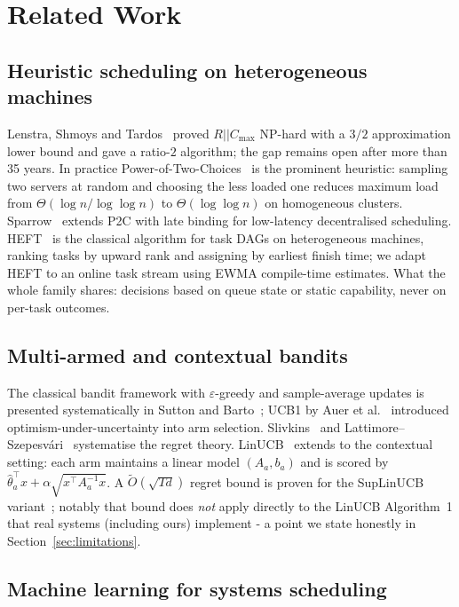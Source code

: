 \documentclass[final,5p,times,twocolumn]{elsarticle}
\begin{document}
\section{Related Work}
\label{sec:related}

\subsection{Heuristic scheduling on heterogeneous machines}

Lenstra, Shmoys and Tardos~\cite{lenstra1990} proved $R||C_{\max}$ NP-hard with a $3/2$ approximation lower bound and gave a ratio-$2$ algorithm; the gap remains open after more than 35 years. In practice Power-of-Two-Choices~\cite{mitzenmacher2001} is the prominent heuristic: sampling two servers at random and choosing the less loaded one reduces maximum load from $\Theta(\log n/\log\log n)$ to $\Theta(\log\log n)$ on homogeneous clusters. Sparrow~\cite{sparrow} extends P2C with late binding for low-latency decentralised scheduling. HEFT~\cite{heft} is the classical algorithm for task DAGs on heterogeneous machines, ranking tasks by upward rank and assigning by earliest finish time; we adapt HEFT to an online task stream using EWMA compile-time estimates. What the whole family shares: decisions based on queue state or static capability, never on per-task outcomes.

\subsection{Multi-armed and contextual bandits}

The classical bandit framework with $\varepsilon$-greedy and sample-average updates is presented systematically in Sutton and Barto~\cite{sutton2018}; UCB1 by Auer et al.~\cite{auer2002} introduced optimism-under-uncertainty into arm selection. Slivkins~\cite{slivkins2019} and Lattimore--Szepesv\'ari~\cite{lattimore2020} systematise the regret theory. LinUCB~\cite{li2010} extends to the contextual setting: each arm maintains a linear model $(A_a,b_a)$ and is scored by $\hat{\theta}_a^\top x+\alpha\sqrt{x^\top A_a^{-1}x}$. A $\tilde{O}(\sqrt{Td})$ regret bound is proven for the SupLinUCB variant~\cite{chu2011}; notably that bound does \emph{not} apply directly to the LinUCB Algorithm~1 that real systems (including ours) implement - a point we state honestly in Section~\ref{sec:limitations}.

\subsection{Machine learning for systems scheduling}
\end{document}
